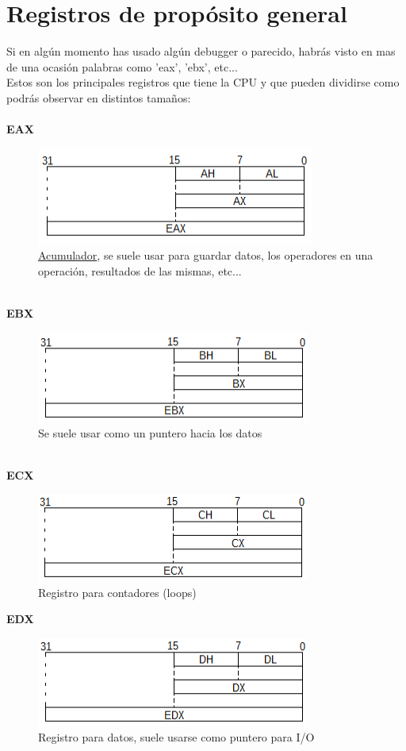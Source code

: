 \documentclass{fennix}
\begin{document}
\newpage
\section{Registros de propósito general}
Si en algún momento has usado algún debugger o parecido, habrás visto en mas de una ocasión palabras como 'eax', 'ebx', etc...\\
Estos son los principales registros que tiene la CPU y que pueden dividirse como podrás observar en distintos tamaños:\\
\\
\textbf{EAX}
\begin{figure}[h]
	\includegraphics{eax}
	\centering
	\caption{\underline{Acumulador}, se suele usar para guardar datos, los operadores en una operación, resultados de las mismas, etc...}
\end{figure}
\\
\textbf{EBX}
\begin{figure}[h]
	\includegraphics{ebx}
	\centering
	\caption{Se suele usar como un puntero hacia los datos}
\end{figure}
\\
\textbf{ECX}
\begin{figure}[h]
	\includegraphics{ecx}
	\centering
	\caption{Registro para contadores (loops)}
\end{figure}
\newpage
\textbf{EDX}
\begin{figure}[h]
	\includegraphics{edx}
	\centering
	\caption{Registro para datos, suele usarse como puntero para I/O}
\end{figure}
\end{document}
